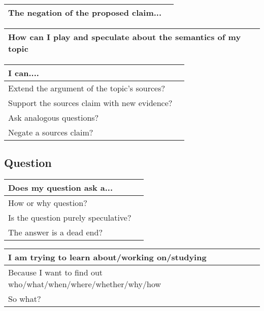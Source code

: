 \documentclass[10pt, a4paper]{article}
\begin{document}
\begin{center}
	\begin{tabular}{|l |l|}
		\hline
		The negation of the proposed claim... &\\
		\hline 
	\end{tabular}
\end{center}

\begin{center}
	\begin{tabular}{|l |l|}
		\hline
		How can I play and speculate about the semantics of my topic &\\
		\hline 
	\end{tabular}
\end{center}
\begin{center}
	\begin{tabular}{|l |l|}
		\hline
		I can.... &\\
		\hline 
		Extend the argument of the topic's sources?&\\
		\hline
		Support the sources claim with new evidence?&\\
		\hline
		Ask analogous questions?&\\
		\hline
		Negate a sources claim?&\\
		\hline
	\end{tabular}
\end{center}
\subsection{Question}
\begin{center}
	\begin{tabular}{|l |l|}
		\hline
		Does my question ask a...&\\
		\hline
		How or why question?&\\
		\hline
		Is the question purely speculative?&\\
		\hline
		The answer is a dead end?&\\
		\hline
	\end{tabular}
\end{center}
\begin{center}
	\begin{tabular}{|l |l|}
		\hline
		I am trying to learn about/working on/studying &\\
		\hline
		Because I want to find out who/what/when/where/whether/why/how&\\
		\hline
		So what?&\\
		\hline
	\end{tabular}
\end{center}
\end{document}

